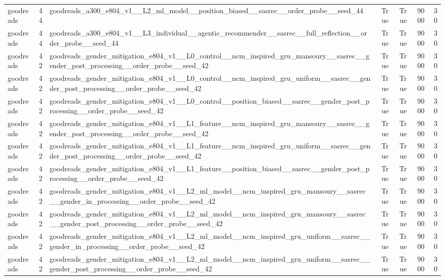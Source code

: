 \begin{table}[htbp!]
\begin{tabular}{lrlrrrr}
goodreads & 44 & goodreads\_a300\_e804\_v1\_\_L2\_ml\_model\_\_position\_biased\_\_sasrec\_\_order\_probe\_\_seed\_44 & True & True & 9000 & 30 \\
goodreads & 44 & goodreads\_a300\_e804\_v1\_\_L3\_individual\_\_agentic\_recommender\_\_sasrec\_\_full\_reflection\_\_order\_probe\_\_seed\_44 & True & True & 9000 & 30 \\
goodreads & 42 & goodreads\_gender\_mitigation\_e804\_v1\_\_L0\_control\_\_ncm\_inspired\_gru\_mansoury\_\_sasrec\_\_gender\_post\_processing\_\_order\_probe\_\_seed\_42 & True & True & 9000 & 30 \\
goodreads & 42 & goodreads\_gender\_mitigation\_e804\_v1\_\_L0\_control\_\_ncm\_inspired\_gru\_uniform\_\_sasrec\_\_gender\_post\_processing\_\_order\_probe\_\_seed\_42 & True & True & 9000 & 30 \\
goodreads & 42 & goodreads\_gender\_mitigation\_e804\_v1\_\_L0\_control\_\_position\_biased\_\_sasrec\_\_gender\_post\_processing\_\_order\_probe\_\_seed\_42 & True & True & 9000 & 30 \\
goodreads & 42 & goodreads\_gender\_mitigation\_e804\_v1\_\_L1\_feature\_\_ncm\_inspired\_gru\_mansoury\_\_sasrec\_\_gender\_post\_processing\_\_order\_probe\_\_seed\_42 & True & True & 9000 & 30 \\
goodreads & 42 & goodreads\_gender\_mitigation\_e804\_v1\_\_L1\_feature\_\_ncm\_inspired\_gru\_uniform\_\_sasrec\_\_gender\_post\_processing\_\_order\_probe\_\_seed\_42 & True & True & 9000 & 30 \\
goodreads & 42 & goodreads\_gender\_mitigation\_e804\_v1\_\_L1\_feature\_\_position\_biased\_\_sasrec\_\_gender\_post\_processing\_\_order\_probe\_\_seed\_42 & True & True & 9000 & 30 \\
goodreads & 42 & goodreads\_gender\_mitigation\_e804\_v1\_\_L2\_ml\_model\_\_ncm\_inspired\_gru\_mansoury\_\_sasrec\_\_gender\_in\_processing\_\_order\_probe\_\_seed\_42 & True & True & 9000 & 30 \\
goodreads & 42 & goodreads\_gender\_mitigation\_e804\_v1\_\_L2\_ml\_model\_\_ncm\_inspired\_gru\_mansoury\_\_sasrec\_\_gender\_post\_processing\_\_order\_probe\_\_seed\_42 & True & True & 9000 & 30 \\
goodreads & 42 & goodreads\_gender\_mitigation\_e804\_v1\_\_L2\_ml\_model\_\_ncm\_inspired\_gru\_uniform\_\_sasrec\_\_gender\_in\_processing\_\_order\_probe\_\_seed\_42 & True & True & 9000 & 30 \\
goodreads & 42 & goodreads\_gender\_mitigation\_e804\_v1\_\_L2\_ml\_model\_\_ncm\_inspired\_gru\_uniform\_\_sasrec\_\_gender\_post\_processing\_\_order\_probe\_\_seed\_42 & True & True & 9000 & 30 \\

\end{tabular}
\end{table}
